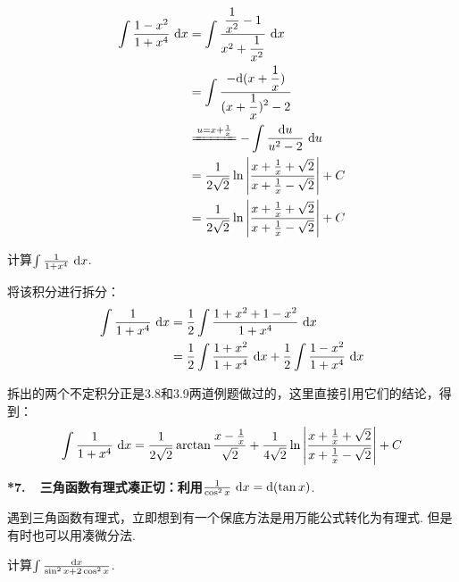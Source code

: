 \begin{solution}
\begin{align*}
    \int \frac{1-x^2}{1+x^4} ~\d x
    &= \int \frac{\displaystyle\frac{1}{x^2}-1}{x^2+\displaystyle\frac{1}{x^2}}~\d x \\
    &= \int \frac{-\d (x+\displaystyle\frac{1}{x})}{(x+\displaystyle\frac{1}{x})^2-2} \\
    &\xlongequal{u = x + \frac{1}{x}} -\int \frac{\d u}{u^2 - 2}~\d u \\
    &= \frac{1}{2\sqrt{2}} \ln \left| \frac{x + \frac{1}{x}+\sqrt{2}}{x + \frac{1}{x}-\sqrt{2}} \right| +C \\
    &= \frac{1}{2\sqrt{2}} \ln \left| \frac{x + \frac{1}{x}+\sqrt{2}}{x + \frac{1}{x}-\sqrt{2}} \right| +C
\end{align*}
\end{solution}

\begin{example}
\label{ex:ch03-10}
计算$\int \frac{1}{1+x^4}~\mathrm{d} x$.
\end{example}

\begin{solution}
将该积分进行拆分：
\begin{equation}
    \begin{aligned}
        \int \frac{1}{1+x^4}~\mathrm{d} x
        &= \frac{1}{2} \int \frac{1+x^2+1-x^2}{1+x^4} ~\mathrm{d} x\\
        &= \frac{1}{2} \int \frac{1+x^2}{1+x^4} ~\mathrm{d} x + \frac{1}{2} \int \frac{1-x^2}{1+x^4} ~\mathrm{d} x
        \nonumber
    \end{aligned}
\end{equation} \par
{}
拆出的两个不定积分正是3.8和3.9两道例题做过的，这里直接引用它们的结论，得到：
$$
\int \frac{1}{1+x^4} ~\mathrm{d} x = \frac{1}{2\sqrt{2}}\arctan{\frac{x-\frac{1}{x}}{\sqrt{2}}}
+\frac{1}{4\sqrt{2}} \ln \left| \frac{x + \frac{1}{x}+\sqrt{2}}{x + \frac{1}{x}-\sqrt{2}} \right| +C
$$
\end{solution}

\textbf{*7.~~三角函数有理式凑正切：利用$\frac{1}{\cos^2 x}~\mathrm{d} x = \mathrm{d} (\tan x)$}.\vspace{1em}


遇到三角函数有理式，立即想到有一个保底方法是用万能公式转化为有理式. 但是有时也可以用凑微分法.

\begin{example}
\label{ex:ch03-11}
计算$\int \frac{\mathrm{d} x}{\sin^2 x + 2\cos^2 x}$.
\end{example}

